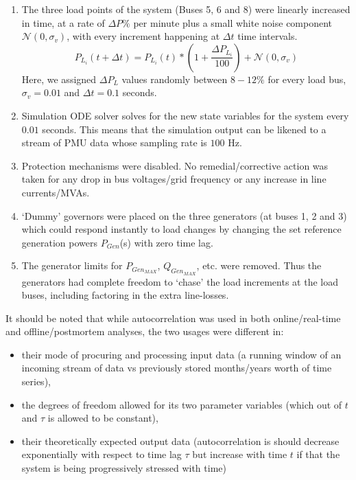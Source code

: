 \begin{enumerate}
	\item The three load points of the system (Buses 5, 6 and 8) were linearly increased in time, at a rate of $\Delta P \%$ per minute plus a small white noise component $\mathcal{N}(0, \sigma_v)$, with every increment happening at $\Delta t$ time intervals. 
	\begin{equation}
		P_{L_i}(t+\Delta t) = P_{L_i}(t)*\left(1+ \frac{\Delta P_{L_i}}{100}\right) + \mathcal{N}(0, \sigma_v)
	\end{equation} 
	Here, we assigned $\Delta P_{L}$ values randomly between $8-12\%$ for every load bus, $\sigma_v = 0.01$ and $\Delta t = 0.1$ seconds.
	\item Simulation ODE solver solves for the new state variables for the system every $0.01$ seconds. This means that the simulation output can be likened to a stream of PMU data whose sampling rate is $100$ Hz.
	\item Protection mechanisms were disabled. No remedial/corrective action was taken for any drop in bus voltages/grid frequency or any increase in line currents/MVAs.
	\item `Dummy' governors were placed on the three generators (at buses 1, 2 and 3) which could respond instantly to load changes by changing the set reference generation powers $P_{Gen}$(s) with zero time lag.
	\item The generator limits for $P_{Gen_{MAX}}$, $Q_{Gen_{MAX}}$, etc. were removed. Thus the generators had complete freedom to `chase' the load increments at the load buses, including factoring in the extra line-losses.
\end{enumerate} 

It should be noted that while autocorrelation was used in both online/real-time and offline/postmortem analyses, the two usages were different in:

\begin{itemize}
	\item their mode of procuring and processing input data (a running window of an incoming stream of data vs previously stored months/years worth of time series),
	\item the degrees of freedom allowed for its two parameter variables (which out of $t$ and $\tau$ is allowed to be constant),
	\item their theoretically expected output data (autocorrelation is should decrease exponentially with respect to time lag $\tau$ but increase with time $t$ if that the system is being progressively stressed with time)
\end{itemize} 
 
 